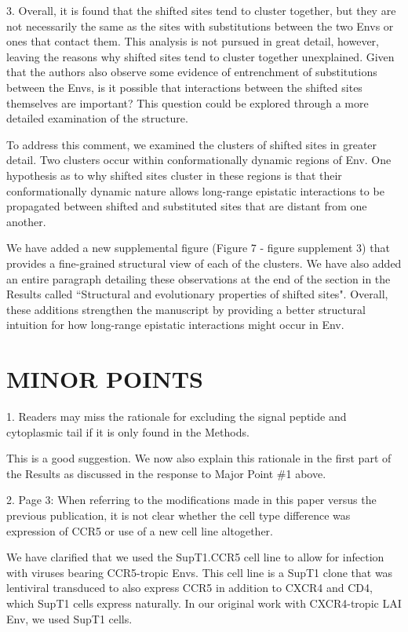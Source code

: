 \documentclass[11pt, oneside]{article}   	%
\begin{document}
3. Overall, it is found that the shifted sites tend to cluster together, but they are not necessarily the same as the sites with substitutions between the two Envs or ones that contact them. This analysis is not pursued in great detail, however, leaving the reasons why shifted sites tend to cluster together unexplained. Given that the authors also observe some evidence of entrenchment of substitutions between the Envs, is it possible that interactions between the shifted sites themselves are important? This question could be explored through a more detailed examination of the structure. 

{\color{black}
To address this comment, we examined the clusters of shifted sites in greater detail.
Two clusters occur within conformationally dynamic regions of Env.
One hypothesis as to why shifted sites cluster in these regions is that their conformationally dynamic nature allows long-range epistatic interactions to be propagated between shifted and substituted sites that are distant from one another.

We have added a new supplemental figure (Figure 7 - figure supplement 3) that provides a fine-grained structural view of each of the clusters.
We have also added an entire paragraph detailing these observations at the end of the section in the Results called ``Structural and evolutionary properties of shifted sites".
Overall, these additions strengthen the manuscript by providing a better structural intuition for how long-range epistatic interactions might occur in Env.
}

\section*{MINOR POINTS}

1. Readers may miss the rationale for excluding the signal peptide and cytoplasmic tail if it is only found in the Methods. 

{\color{black}
This is a good suggestion.
We now also explain this rationale in the first part of the Results as discussed in the response to Major Point \#1 above.}

2. Page 3: When referring to the modifications made in this paper versus the previous publication, it is not clear whether the cell type difference was expression of CCR5 or use of a new cell line altogether. 

{\color{black}
We have clarified that we used the SupT1.CCR5 cell line to allow for infection with viruses bearing CCR5-tropic Envs. This cell line is a SupT1 clone that was lentiviral transduced to also express CCR5 in addition to CXCR4 and CD4, which SupT1 cells express naturally. In our original work with CXCR4-tropic LAI Env, we used SupT1 cells. 
}
\end{document}
